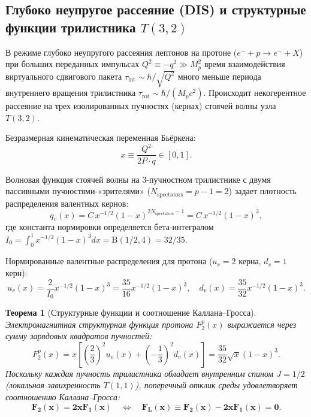 \documentclass[11pt,a4paper,oneside]{article}
\theoremstyle{plain}
\newtheorem{theorem}{Теорема}[section]
\theoremstyle{definition}
\theoremstyle{remark}
\numberwithin{equation}{section}
\begin{document}
	\subsection{Глубоко неупругое рассеяние (DIS) и структурные функции трилистника $T(3,2)$}
	
	В режиме глубоко неупругого рассеяния лептонов на протоне ($e^- + p \to e^- + X$) при больших переданных импульсах $Q^2 \equiv -q^2 \gg M_p^2$ время взаимодействия виртуального сдвигового пакета $\tau_{\text{int}} \sim \hbar/\sqrt{Q^2}$ много меньше периода внутреннего вращения трилистника $\tau_{\text{rot}} \sim \hbar/(M_p c^2)$. Происходит некогерентное рассеяние на трех изолированных пучностях (кернах) стоячей волны узла $T(3,2)$.
	
	Безразмерная кинематическая переменная Бьёркена:
	\begin{equation}
		x \equiv \frac{Q^2}{2 P \cdot q} \in [0, 1].
	\end{equation}
	
	Волновая функция стоячей волны на 3-пучностном трилистнике с двумя пассивными пучностями-«зрителями» ($N_{\text{spectators}} = p - 1 = 2$) задает плотность распределения валентных кернов:
	\begin{equation}
		q_v(x) = C \, x^{-1/2} (1 - x)^{2 N_{\text{spectators}} - 1} = C \, x^{-1/2} (1 - x)^3,
	\end{equation}
	где константа нормировки определяется бета-интегралом $I_0 = \int_0^1 x^{-1/2}(1-x)^3 dx = \mathrm{B}(1/2, 4) = 32/35$.
	
	Нормированные валентные распределения для протона ($u_v = 2$ керна, $d_v = 1$ керн):
	\begin{equation}
		u_v(x) = \frac{2}{I_0} x^{-1/2}(1 - x)^3 = \frac{35}{16} x^{-1/2}(1 - x)^3, \quad d_v(x) = \frac{35}{32} x^{-1/2}(1 - x)^3.
	\end{equation}
	
	\begin{theorem}[Структурные функции и соотношение Каллана--Гросса]
		Электромагнитная структурная функция протона $F_2^p(x)$ выражается через сумму зарядовых квадратов пучностей:
		\begin{equation}
			F_2^p(x) = x \left[ \left(\frac{2}{3}\right)^2 u_v(x) + \left(-\frac{1}{3}\right)^2 d_v(x) \right] = \frac{35}{32} \sqrt{x} (1 - x)^3.
		\end{equation}
		Поскольку каждая пучность трилистника обладает внутренним спином $J=1/2$ (локальная завихренность $T(1,1)$), поперечный отклик среды удовлетворяет соотношению Каллана--Гросса:
		\begin{equation}
			\mathbf{F_2(x) = 2x F_1(x)} \quad \Longleftrightarrow \quad \mathbf{F_L(x) \equiv F_2(x) - 2x F_1(x) = 0}.
		\end{equation}
	\end{theorem}
	
\end{document}
